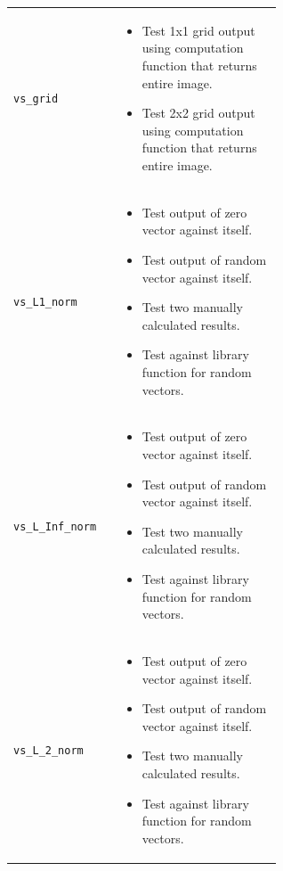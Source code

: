 \begin{appendices}
\begin{table}[h]
\begin{tabular}{ l p{0.6\linewidth} }
%		
		\texttt{vs\_grid} &
		\begin{minipage}[t]{\linewidth}
			\begin{itemize}[leftmargin=*]
				\item Test 1x1 grid output using computation function that returns entire image.
				\item Test 2x2 grid output using computation function that returns entire image.
			\end{itemize}
		\end{minipage} \\
%		
		\texttt{vs\_L1\_norm} &
		\begin{minipage}[t]{\linewidth}
			\begin{itemize}[leftmargin=*]
				\item Test output of zero vector against itself.
				\item Test output of random vector against itself. 
				\item Test two manually calculated results.
				\item Test against library function for random vectors.
			\end{itemize}
		\end{minipage} \\
%		
		\texttt{vs\_L\_Inf\_norm} &
		\begin{minipage}[t]{\linewidth}
			\begin{itemize}[leftmargin=*]
				\item Test output of zero vector against itself.
				\item Test output of random vector against itself. 
				\item Test two manually calculated results.
				\item Test against library function for random vectors.
			\end{itemize}
		\end{minipage} \\
%		
		\texttt{vs\_L\_2\_norm} &
		\begin{minipage}[t]{\linewidth}
			\begin{itemize}[leftmargin=*]
				\item Test output of zero vector against itself.
				\item Test output of random vector against itself. 
				\item Test two manually calculated results.
				\item Test against library function for random vectors.
			\end{itemize}

\end{minipage}
\end{tabular}
\end{table}
\end{appendices}
